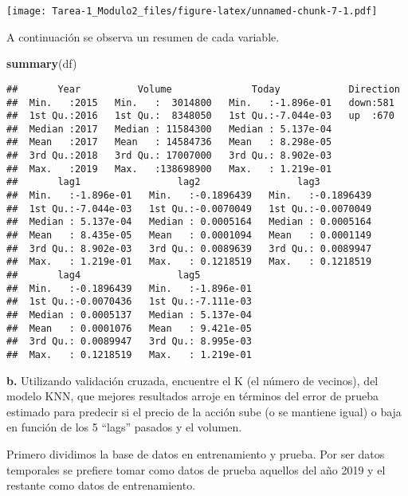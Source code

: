 \documentclass[
]{article}
\newenvironment{Shaded}{\begin{snugshade}}{\end{snugshade}}
\newcommand{\CommentTok}[1]{\textcolor[rgb]{0.56,0.35,0.01}{\textit{#1}}}
\newcommand{\DecValTok}[1]{\textcolor[rgb]{0.00,0.00,0.81}{#1}}
\newcommand{\KeywordTok}[1]{\textcolor[rgb]{0.13,0.29,0.53}{\textbf{#1}}}
\newcommand{\NormalTok}[1]{#1}
\newcommand{\OperatorTok}[1]{\textcolor[rgb]{0.81,0.36,0.00}{\textbf{#1}}}
\newcommand{\StringTok}[1]{\textcolor[rgb]{0.31,0.60,0.02}{#1}}
\begin{document}
\texttt{[image: Tarea-1\_Modulo2\_files/figure-latex/unnamed-chunk-7-1.pdf]}

A continuación se observa un resumen de cada variable.

\begin{Shaded}
\begin{Highlighting}[]
\KeywordTok{summary}\NormalTok{(df)}
\end{Highlighting}
\end{Shaded}

\begin{verbatim}
##       Year          Volume              Today            Direction 
##  Min.   :2015   Min.   :  3014800   Min.   :-1.896e-01   down:581  
##  1st Qu.:2016   1st Qu.:  8348050   1st Qu.:-7.044e-03   up  :670  
##  Median :2017   Median : 11584300   Median : 5.137e-04             
##  Mean   :2017   Mean   : 14584736   Mean   : 8.298e-05             
##  3rd Qu.:2018   3rd Qu.: 17007000   3rd Qu.: 8.902e-03             
##  Max.   :2019   Max.   :138698900   Max.   : 1.219e-01             
##       lag1                 lag2                 lag3           
##  Min.   :-1.896e-01   Min.   :-0.1896439   Min.   :-0.1896439  
##  1st Qu.:-7.044e-03   1st Qu.:-0.0070049   1st Qu.:-0.0070049  
##  Median : 5.137e-04   Median : 0.0005164   Median : 0.0005164  
##  Mean   : 8.435e-05   Mean   : 0.0001094   Mean   : 0.0001149  
##  3rd Qu.: 8.902e-03   3rd Qu.: 0.0089639   3rd Qu.: 0.0089947  
##  Max.   : 1.219e-01   Max.   : 0.1218519   Max.   : 0.1218519  
##       lag4                 lag5           
##  Min.   :-0.1896439   Min.   :-1.896e-01  
##  1st Qu.:-0.0070436   1st Qu.:-7.111e-03  
##  Median : 0.0005137   Median : 5.137e-04  
##  Mean   : 0.0001076   Mean   : 9.421e-05  
##  3rd Qu.: 0.0089947   3rd Qu.: 8.995e-03  
##  Max.   : 0.1218519   Max.   : 1.219e-01
\end{verbatim}

\textbf{b.} Utilizando validación cruzada, encuentre el K (el número de
vecinos), del modelo KNN, que mejores resultados arroje en términos del
error de prueba estimado para predecir si el precio de la acción sube (o
se mantiene igual) o baja en función de los 5 ``lags'' pasados y el
volumen.

Primero dividimos la base de datos en entrenamiento y prueba. Por ser
datos temporales se prefiere tomar como datos de prueba aquellos del año
2019 y el restante como datos de entrenamiento.

\begin{Shaded}
\end{Shaded}
\end{document}
